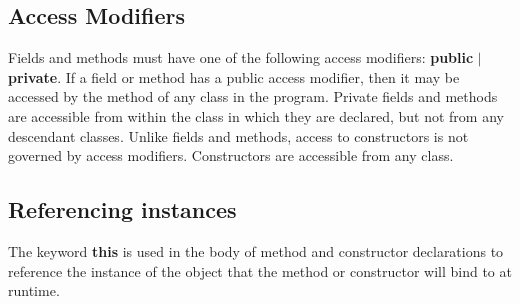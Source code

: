 \begin{homeworkProblem}
	\subsection{Access Modifiers}
	Fields and methods must have one of the following access modifiers: \textbf{public} $|$ \textbf{private}. If a field or method has a public access modifier, then it may be accessed by the method of any class in the program. Private fields and methods are accessible from within the class in which they are declared, but not from any descendant classes.
	\newline
	Unlike fields and methods, access to constructors is not governed by access modifiers. Constructors are accessible from any class.
	
	
	\subsection{Referencing instances}
	The keyword \textbf{this} is used in the body of method and constructor declarations to reference the instance of the object that the method or constructor will bind to at runtime.
	
\end{homeworkProblem}
